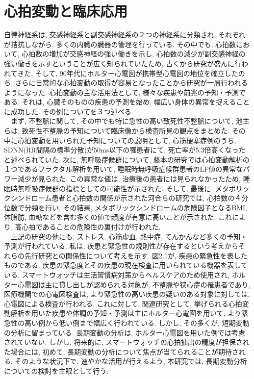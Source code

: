 \documentclass[report, 11pt, a4paper]{jsbook}
\begin{document}
\section{心拍変動と臨床応用}
自律神経系は, 交感神経系と副交感神経系の２つの神経系に分類され, それぞれが拮抗しながら, 多くの内臓の臓器の管理を行っている. その中でも, 心拍数において, 心拍数の増加が交感神経の強い働きを示し, 心拍数の減少が副交感神経の強い働きを示すということが広く知られていたため, 古くから研究が盛んに行われてきた. そして, 90年代にホルター心電図が携帯型心電図の地位を確立したのち, さらに日常的な心拍変動の取得が容易となったことから研究が一層行われるようになった. 心拍変動の主な活用法として, 様々な疾患や前兆の予知・予測である. それは, 心臓そのものの疾患の予測を始め, 幅広い身体の異常を捉えることに成功した. その例についてを３つ述べる. \\
　まず,  不整脈に関して, その中でも特に急性の高い致死性不整脈について, 池主らは, 致死性不整脈の予知について臨床像から検査所見の観点をまとめた\cite{lethal}. その中に心拍変動を用いられた予知についての説明として, 心筋梗塞症例のうち, SDNN(RR間隔の標準分散)が50ms以下の罹患者にて, 死亡率が5.3倍高くなったと述べられていた. 次に, 無呼吸症候群について, 藤本の研究では心拍変動解析の１つであるフラクタル解析を用いて, 睡眠時無呼吸症候群患者のLF値の異常なパワー減少が見られた\cite{apnea}. この異常な値は, 治療後の患者には見られなかったため, 睡眠時無呼吸症候群の指標としての可能性が示された. そして, 最後に, メタボリックシンドローム患者と心拍数の関係が示された河合らの研究では, 心拍数の４分位数で分類を行い, その結果, メタボリックシンドロームの危険因子となるBMI, 体脂肪, 血糖などを含む多くの値で頻度が有意に高いことが示された\cite{metabo}. これにより, 高心拍であることの危険性の裏付けが行われた.\\
　上記の研究の他にも, ストレス, 心筋虚血, 熱中症, てんかんなど多くの予知・予測が行われている. 私は, 疾患と緊急性の規則性が存在するという考えからそれらの先行研究との関係性について考えを示す. 図2.1が, 疾患の緊急性を表したものである. 疾患の緊急度とその疾患の現在検査に用いられている機器を表している. スマートウォッチは生活習慣病対策からヘルスケアのため使用され, ホルター心電図は主に貸し出しが認められる対象が, 不整脈や狭心症の罹患者であり, 医療機関での心電図検査は, より緊急性の高い疾患の疑いのある対象に対しては, 心電図による検査が行われる. これに対して, 関連研究として, 挙げられる心拍変動解析を用いた疾患や体調の予知・予測は主にホルター心電図を用いて, より緊急性の高い例から低い例まで幅広く行われている. しかし, その多くが, 短期変動の分析に留まっている. 長期変動の分析は, ホルター心電図を用いた例では考慮されていない. しかし, 将来的に, スマートウォッチの心拍抽出の精度が担保された場合には, 初めて, 長期変動の分析について焦点が当てられることが期待される. そのような状況下で, 速やかな活用が行えるよう, 本研究では, 長期変動分析についての検討を主眼として行う. 
\end{document}
